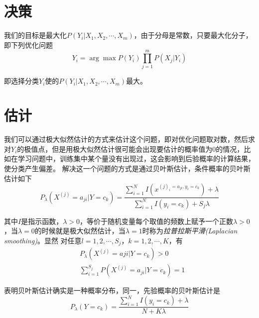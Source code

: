 \section{决策}

我们的目标是最大化$P(Y_i|X_1,X_2,\cdots,X_m)$，由于分母是常数，只要最大化分子，即下列优化问题
\begin{equation}
    Y_i=\arg\max\limits_{}P(Y_i)\prod_{j=1}^{m}P(X_j|Y_i)
\end{equation}

即选择分类$Y_i$使的$P(Y_i|X_1,X_2,\cdots,X_m)$最大。

\section{估计}

我们可以通过极大似然估计的方式来估计这个问题，即对优化问题取对数，然后求对$Y_i$的极值点，但是用极大似然估计很可能会出现要估计的概率值为$0$的情况，比如在学习问题中，训练集中某个量没有出现过，这会影响到后验概率的计算结果，使分类产生偏差。
解决这一个问题的方式是通过贝叶斯估计，条件概率的贝叶斯估计如下
\begin{equation}
    P_{\lambda}(X^{(j)}=a_{ji}|Y=c_k)=\frac{\sum\limits_{i=1}^{N}I(x^{(j)_i=a_{ji},y_i=c_k})+\lambda}{\sum\limits_{i=1}^{N}I(y_i=c_k)+S_j\lambda}
\end{equation}

其中$I$是指示函数，$\lambda>0$，等价于随机变量每个取值的频数上赋予一个正数$\lambda>0$，当$\lambda=0$的时候就是极大似然估计，当$\lambda=1$时称为\textsl{拉普拉斯平滑(Laplacian smoothing)}。显然
对任意$l=1,2,\cdots,S_j$，$k=1,2,\cdots,K$，有
\begin{equation}
    \begin{aligned}
        & P_{\lambda}(X^{(j)}=aji|Y=c_k)>0\\
        & \sum_{i=1}^{S_j}P(X^{(j)}=a_{ji}|Y=c_k)=1
    \end{aligned}
\end{equation}

表明贝叶斯估计确实是一种概率分布，同一，先验概率的贝叶斯估计是
\begin{equation}
    P_{\lambda}(Y=c_k)=\frac{\sum\limits_{i=1}^{N}I(y_i=c_k)+\lambda}{N+K\lambda}
\end{equation}